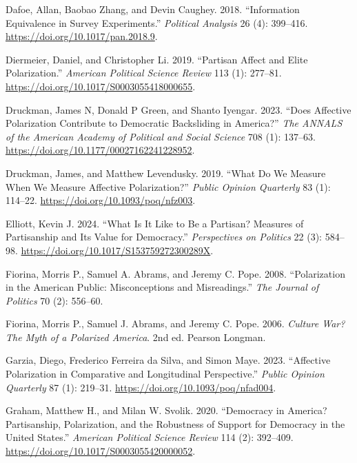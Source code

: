\documentclass[
  12pt,
  a4paper,
  DIV=11,
  numbers=noendperiod]{scrartcl}
\newlength{\cslhangindent}
\newenvironment{CSLReferences}[2] %
 {\begin{list}{}{%
  \setlength{\itemindent}{0pt}
  \setlength{\leftmargin}{0pt}
  \setlength{\parsep}{0pt}
  \ifodd #1
   \setlength{\leftmargin}{\cslhangindent}
   \setlength{\itemindent}{-1\cslhangindent}
  \fi
  \setlength{\itemsep}{#2\baselineskip}}}
 {\end{list}}
\begin{document}
\begin{CSLReferences}{1}{0}
Dafoe, Allan, Baobao Zhang, and Devin Caughey. 2018. {``Information
Equivalence in Survey Experiments.''} \emph{Political Analysis} 26 (4):
399--416. \url{https://doi.org/10.1017/pan.2018.9}.

Diermeier, Daniel, and Christopher Li. 2019. {``Partisan Affect and
Elite Polarization.''} \emph{American Political Science Review} 113 (1):
277--81. \url{https://doi.org/10.1017/S0003055418000655}.

Druckman, James N, Donald P Green, and Shanto Iyengar. 2023. {``Does
Affective Polarization Contribute to Democratic Backsliding in
America?''} \emph{The ANNALS of the American Academy of Political and
Social Science} 708 (1): 137--63.
\url{https://doi.org/10.1177/00027162241228952}.

Druckman, James, and Matthew Levendusky. 2019. {``What Do We Measure
When We Measure Affective Polarization?''} \emph{Public Opinion
Quarterly} 83 (1): 114--22. \url{https://doi.org/10.1093/poq/nfz003}.

Elliott, Kevin J. 2024. {``What Is It Like to Be a Partisan? Measures of
Partisanship and Its Value for Democracy.''} \emph{Perspectives on
Politics} 22 (3): 584--98.
\url{https://doi.org/10.1017/S153759272300289X}.

Fiorina, Morris P., Samuel A. Abrams, and Jeremy C. Pope. 2008.
{``Polarization in the American Public: Misconceptions and
Misreadings.''} \emph{The Journal of Politics} 70 (2): 556--60.

Fiorina, Morris P., Samuel J. Abrams, and Jeremy C. Pope. 2006.
\emph{Culture War? The Myth of a Polarized America}. 2nd ed. Pearson
Longman.

Garzia, Diego, Frederico Ferreira da Silva, and Simon Maye. 2023.
{``Affective Polarization in Comparative and Longitudinal
Perspective.''} \emph{Public Opinion Quarterly} 87 (1): 219--31.
\url{https://doi.org/10.1093/poq/nfad004}.

Graham, Matthew H., and Milan W. Svolik. 2020. {``Democracy in America?
Partisanship, Polarization, and the Robustness of Support for Democracy
in the United States.''} \emph{American Political Science Review} 114
(2): 392--409. \url{https://doi.org/10.1017/S0003055420000052}.


\end{CSLReferences}
\end{document}
